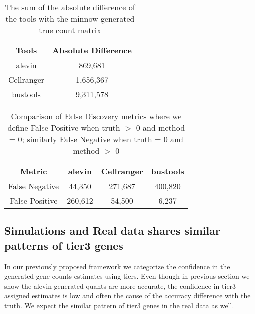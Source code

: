 \begin{table}[h!]
	\centering
	 \begin{tabular}{|| c | c||} 
		 \hline
		 Tools & Absolute Difference \\ [0.5ex] 
		 \hline\hline
		 alevin & 869,681 \\
		 \hline
		 Cellranger & 1,656,367 \\
		 \hline
		 bustools & 9,311,578 \\ [1ex] 
		 \hline
 	\end{tabular}
	\caption{The sum of the absolute difference of the tools with the minnow generated 
	true count matrix }
	\label{tab:matrix_diff}
\end{table}

\begin{table}[h!]
	\centering
	 \begin{tabular}{|| c | c | c | | c||} 
		 \hline
		 Metric & alevin & Cellranger & bustools \\ [0.5ex] 
		 \hline\hline
		 False Negative & 44,350 & 271,687 & 400,820 \\
		 \hline
		 False Positive & 260,612 & 54,500 & 6,237 \\ [1ex] 
		 \hline
 	\end{tabular}
	\caption{Comparison of False Discovery metrics where we define False Positive when truth 
	$>$ 0 and method = 0; similarly False Negative when truth = 0 and method $>$ 0}
	\label{tab:f1}
\end{table}

\subsection{Simulations and Real data shares similar patterns of tier3 genes}
In our previously proposed framework we categorize the confidence in the generated gene counts 
estimates using tiers. Even though in previous section we show the alevin generated quants are 
more accurate, the confidence in tier3 assigned estimates is low and often the cause of the 
accuracy difference with the truth. We expect the similar pattern of tier3 genes in the real 
data as well. 

